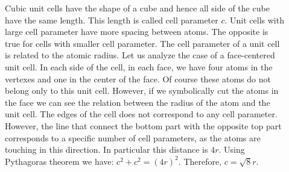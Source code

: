 \documentclass[main.tex]{subfiles}
\newcommand\chapterlabel{solids}
\begin{document}
\begin{description}
%
\item[] Cubic unit cells have the shape of a cube and hence all side of the cube have the same length. This length is called cell parameter $c$. Unit cells with large cell parameter have more spacing between atoms. The opposite is true for cells with smaller cell parameter. The cell parameter of a unit cell is related to the atomic radius. Let us analyze the case of a face-centered unit cell. In each side of the cell, in each face, we have four atoms in the vertexes and one in the center of the face. Of course these atoms do not belong only to this unit cell. However, if we symbolically cut the atoms in the face we can see the relation between the radius of the atom and the unit cell. The edges of the cell does not correspond to any cell parameter. However, the line that connect the bottom part with the opposite top part corresponds to a specific number of cell parameters, as the atoms are touching in this direction. In particular this distance is $4r$. Using Pythagoras theorem we have: $c^2+c^2=(4r)^2$. Therefore, $c=\sqrt{8}r$. 

 \savebox{}
\begin{center}\scalebox{0.5}{
\begin{tikzpicture}


\end{tikzpicture}}
\end{center}
\end{description}
\end{document}
